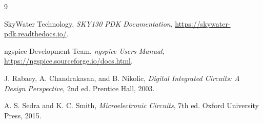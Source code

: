 \begin{thebibliography}{9}

SkyWater Technology, \emph{SKY130 PDK Documentation}, \url{https://skywater-pdk.readthedocs.io/}.

ngspice Development Team, \emph{ngspice Users Manual}, \url{https://ngspice.sourceforge.io/docs.html}.

J. Rabaey, A. Chandrakasan, and B. Nikolic, \emph{Digital Integrated Circuits: A Design Perspective}, 2nd ed. Prentice Hall, 2003.

A. S. Sedra and K. C. Smith, \emph{Microelectronic Circuits}, 7th ed. Oxford University Press, 2015.

\end{thebibliography}
